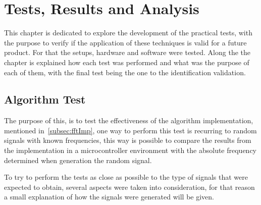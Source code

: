 \cleardoublepage
\chapter{Tests, Results and Analysis}\label{chap:Tests}
This chapter is dedicated to explore the development of the practical tests, with the purpose to verify if the application of these techniques is valid for a future product. For that the setups, hardware and software were tested. Along the the chapter is explained how each test was performed and what was the purpose of each of them, with the final test being the one to the identification validation. 
\section{Algorithm Test}
The purpose of this, is to test the effectiveness of the algorithm implementation, mentioned in~\ref{subsec:fftImp}, one way to perform this test is recurring to random signals with known frequencies, this way is possible to compare the results from the implementation in a microcontroller environment with the absolute frequency determined when generation the random signal.

To try to perform the tests as close as possible to the type of signals that were expected to obtain, several aspects were taken into consideration, for that reason a small explanation of how the signals were generated will be given. 
